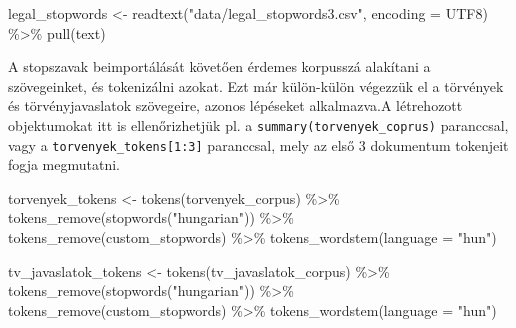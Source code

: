 \documentclass[
]{book}
\newenvironment{Shaded}{\begin{snugshade}}{\end{snugshade}}
\newcommand{\AttributeTok}[1]{\textcolor[rgb]{0.77,0.63,0.00}{#1}}
\newcommand{\FunctionTok}[1]{\textcolor[rgb]{0.00,0.00,0.00}{#1}}
\newcommand{\NormalTok}[1]{#1}
\newcommand{\OtherTok}[1]{\textcolor[rgb]{0.56,0.35,0.01}{#1}}
\newcommand{\SpecialCharTok}[1]{\textcolor[rgb]{0.00,0.00,0.00}{#1}}
\newcommand{\StringTok}[1]{\textcolor[rgb]{0.31,0.60,0.02}{#1}}
\begin{document}
\begin{Shaded}
\begin{Highlighting}[]
\NormalTok{legal\_stopwords }\OtherTok{\textless{}{-}} \FunctionTok{readtext}\NormalTok{(}\StringTok{"data/legal\_stopwords3.csv"}\NormalTok{, }\AttributeTok{encoding =} \StringTok{\textquotesingle{}UTF8\textquotesingle{}}\NormalTok{) }\SpecialCharTok{\%\textgreater{}\%}
  \FunctionTok{pull}\NormalTok{(text)}
\end{Highlighting}
\end{Shaded}

A stopszavak beimportálását követően érdemes korpusszá alakítani a
szövegeinket, és tokenizálni azokat. Ezt már külön-külön végezzük el a
törvények és törvényjavaslatok szövegeire, azonos lépéseket alkalmazva.A
létrehozott objektumokat itt is ellenőrizhetjük pl. a
\texttt{summary(torvenyek\_coprus)} paranccsal, vagy a
\texttt{torvenyek\_tokens{[}1:3{]}} paranccsal, mely az első 3
dokumentum tokenjeit fogja megmutatni.

\begin{Shaded}
\end{Shaded}

\begin{Shaded}
\begin{Highlighting}[]
\NormalTok{torvenyek\_tokens }\OtherTok{\textless{}{-}} \FunctionTok{tokens}\NormalTok{(torvenyek\_corpus) }\SpecialCharTok{\%\textgreater{}\%}
  \FunctionTok{tokens\_remove}\NormalTok{(}\FunctionTok{stopwords}\NormalTok{(}\StringTok{"hungarian"}\NormalTok{)) }\SpecialCharTok{\%\textgreater{}\%}
  \FunctionTok{tokens\_remove}\NormalTok{(custom\_stopwords) }\SpecialCharTok{\%\textgreater{}\%}
  \FunctionTok{tokens\_wordstem}\NormalTok{(}\AttributeTok{language =} \StringTok{"hun"}\NormalTok{)}

\NormalTok{tv\_javaslatok\_tokens }\OtherTok{\textless{}{-}} \FunctionTok{tokens}\NormalTok{(tv\_javaslatok\_corpus) }\SpecialCharTok{\%\textgreater{}\%}
  \FunctionTok{tokens\_remove}\NormalTok{(}\FunctionTok{stopwords}\NormalTok{(}\StringTok{"hungarian"}\NormalTok{)) }\SpecialCharTok{\%\textgreater{}\%}
  \FunctionTok{tokens\_remove}\NormalTok{(custom\_stopwords) }\SpecialCharTok{\%\textgreater{}\%}
  \FunctionTok{tokens\_wordstem}\NormalTok{(}\AttributeTok{language =} \StringTok{"hun"}\NormalTok{)}
\end{Highlighting}
\end{Shaded}
\end{document}
